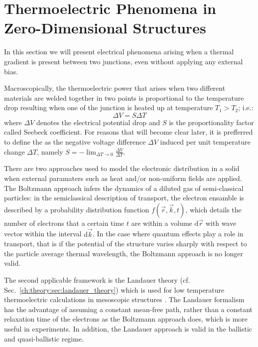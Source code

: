 \section{Thermoelectric Phenomena in Zero-Dimensional Structures}

In this section we will present electrical phenomena arising when a thermal gradient is present between two junctions, even without applying any external bias.

Macroscopically, the thermoelectric power that arises when two different materials are welded together in two points is proportional to the temperature drop resulting when one of the junction is heated up at temperature $T_1 > T_2$; i.e.:
\begin{equation}\label{ch2:eq:seeback_coeff}
    \Delta V = S\Delta T
\end{equation}
where $\Delta V $ denotes the electrical potential drop and $S$ is the proportionality factor called Seebeck coefficient. For reasons that will become clear later, it is prefferred to define the as the negative voltage difference $\Delta V$ induced per unit temperature change $\Delta T$, namely $S = - \lim_{\Delta T\to 0} \frac{\Delta V}{\Delta T}$.

There are two approaches used to model the electronic distribution in a solid when external paramaters such as heat and/or non-uniform fields are applied. The Boltzmann approach infers the dynamics of a diluted gas of semi-classical particles: in the semiclassical description of transport, the electron ensamble is described by a probability distribution function $f(\vec{r}, \vec{k}, t)$, which details the number of electrons that a certain time $t$ are within a volume $\text{d}\vec{r}$ with wave vector within the interval $\text{d}\vec{k}$. In the case where quantum effects play a role in transport, that is if the potential of the structure varies sharply with respect to the particle average thermal wavelength, the Boltzmann approach is no longer valid.

The second applicable framework is the Landauer theory (cf. Sec.~\ref{ch:theory:sec:landauer_theory}) which is used for low temperature thermoelectric calculations in mesoscopic structures \cite{cuevas2010molecular}. The Landauer formalism has the advantage of assuming a constant mean-free path, rather than a constant relaxation time of the electrons as the Boltzmann approach does, which
is more useful in experiments. In addition, the Landauer approach is valid in the ballistic and quasi-ballistic regime.

